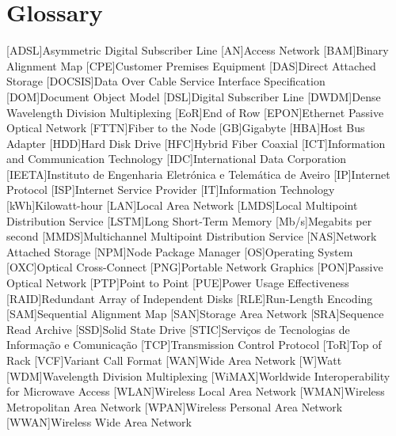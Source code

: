 \chapter{Glossary}

\footnotesize
\SingleSpacing

\begin{multicols}{2}
\begin{acronym}[AAAAAA]


	[ADSL]{Asymmetric Digital Subscriber Line}
	[AN]{Access Network}
	[BAM]{Binary Alignment Map}
	[CPE]{Customer Premises Equipment}
	[DAS]{Direct Attached Storage}
	[DOCSIS]{Data Over Cable Service Interface Specification}
	[DOM]{Document Object Model}
	[DSL]{Digital Subscriber Line}
	[DWDM]{Dense Wavelength Division Multiplexing}
	[EoR]{End of Row}
	[EPON]{Ethernet Passive Optical Network}
	[FTTN]{Fiber to the Node}
	[GB]{Gigabyte}
	[HBA]{Host Bus Adapter}
	[HDD]{Hard Disk Drive}
	[HFC]{Hybrid Fiber Coaxial}
	[ICT]{Information and Communication Technology}
	[IDC]{International Data Corporation}
	[IEETA]{Instituto de Engenharia Eletrónica e Telemática de Aveiro}
	[IP]{Internet Protocol}
	[ISP]{Internet Service Provider}
	[IT]{Information Technology}
	[kWh]{Kilowatt-hour}
	[LAN]{Local Area Network}
	[LMDS]{Local Multipoint Distribution Service}
	[LSTM]{Long Short-Term Memory}
	[Mb/s]{Megabits per second}
	[MMDS]{Multichannel Multipoint Distribution Service}
	[NAS]{Network Attached Storage}
	[NPM]{Node Package Manager}
	[OS]{Operating System}
	[OXC]{Optical Cross-Connect}
	[PNG]{Portable Network Graphics}
	[PON]{Passive Optical Network}
	[PTP]{Point to Point}
	[PUE]{Power Usage Effectiveness}
	[RAID]{Redundant Array of Independent Disks}
	[RLE]{Run-Length Encoding}
	[SAM]{Sequential Alignment Map}
	[SAN]{Storage Area Network}
	[SRA]{Sequence Read Archive}
	[SSD]{Solid State Drive}
	[STIC]{Serviços de Tecnologias de Informação e Comunicação}
	[TCP]{Transmission Control Protocol}
	[ToR]{Top of Rack}
	[VCF]{Variant Call Format}
	[WAN]{Wide Area Network}
	{Watt}
	[WDM]{Wavelength Division Multiplexing}
	[WiMAX]{Worldwide Interoperability for Microwave Access}
	[WLAN]{Wireless Local Area Network}
	[WMAN]{Wireless Metropolitan Area Network}
	[WPAN]{Wireless Personal Area Network}
	[WWAN]{Wireless Wide Area Network}


\end{acronym}
\end{multicols}


